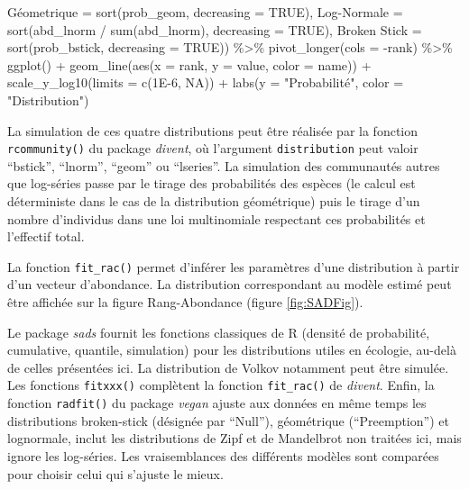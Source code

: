 \documentclass[
  11pt,
  american,
  a4paper,
  extrafontsizes,onecolumn,openright
  ]{memoir}
\newenvironment{Shaded}{\begin{snugshade}}{\end{snugshade}}
\newcommand{\AttributeTok}[1]{\textcolor[rgb]{0.77,0.63,0.00}{#1}}
\newcommand{\ConstantTok}[1]{\textcolor[rgb]{0.00,0.00,0.00}{#1}}
\newcommand{\FloatTok}[1]{\textcolor[rgb]{0.00,0.00,0.81}{#1}}
\newcommand{\FunctionTok}[1]{\textcolor[rgb]{0.00,0.00,0.00}{#1}}
\newcommand{\NormalTok}[1]{#1}
\newcommand{\OtherTok}[1]{\textcolor[rgb]{0.56,0.35,0.01}{#1}}
\newcommand{\SpecialCharTok}[1]{\textcolor[rgb]{0.00,0.00,0.00}{#1}}
\newcommand{\StringTok}[1]{\textcolor[rgb]{0.31,0.60,0.02}{#1}}
\begin{document}
\begin{Shaded}
\begin{Highlighting}[]
  \StringTok{\textasciigrave{}}\AttributeTok{Géometrique}\StringTok{\textasciigrave{}} \OtherTok{=} \FunctionTok{sort}\NormalTok{(prob\_geom, }\AttributeTok{decreasing =} \ConstantTok{TRUE}\NormalTok{),}
  \StringTok{\textasciigrave{}}\AttributeTok{Log{-}Normale}\StringTok{\textasciigrave{}} \OtherTok{=} \FunctionTok{sort}\NormalTok{(abd\_lnorm }\SpecialCharTok{/} \FunctionTok{sum}\NormalTok{(abd\_lnorm), }\AttributeTok{decreasing =} \ConstantTok{TRUE}\NormalTok{),}
  \StringTok{\textasciigrave{}}\AttributeTok{Broken Stick}\StringTok{\textasciigrave{}} \OtherTok{=} \FunctionTok{sort}\NormalTok{(prob\_bstick, }\AttributeTok{decreasing =} \ConstantTok{TRUE}\NormalTok{)) }\SpecialCharTok{\%\textgreater{}\%} 
  \FunctionTok{pivot\_longer}\NormalTok{(}\AttributeTok{cols =} \SpecialCharTok{{-}}\NormalTok{rank) }\SpecialCharTok{\%\textgreater{}\%} 
  \FunctionTok{ggplot}\NormalTok{() }\SpecialCharTok{+}
    \FunctionTok{geom\_line}\NormalTok{(}\FunctionTok{aes}\NormalTok{(}\AttributeTok{x =}\NormalTok{ rank, }\AttributeTok{y =}\NormalTok{ value, }\AttributeTok{color =}\NormalTok{ name)) }\SpecialCharTok{+}
    \FunctionTok{scale\_y\_log10}\NormalTok{(}\AttributeTok{limits =} \FunctionTok{c}\NormalTok{(}\FloatTok{1E{-}6}\NormalTok{, }\ConstantTok{NA}\NormalTok{)) }\SpecialCharTok{+}
    \FunctionTok{labs}\NormalTok{(}\AttributeTok{y =} \StringTok{"Probabilité"}\NormalTok{, }\AttributeTok{color =} \StringTok{"Distribution"}\NormalTok{)}
\end{Highlighting}
\end{Shaded}

\normalsize

La simulation de ces quatre distributions peut être réalisée par la fonction \texttt{rcommunity()} du package \emph{divent}, où l'argument \texttt{distribution} peut valoir \enquote{bstick}, \enquote{lnorm}, \enquote{geom} ou \enquote{lseries}.
La simulation des communautés autres que log-séries passe par le tirage des probabilités des espèces (le calcul est déterministe dans le cas de la distribution géométrique) puis le tirage d'un nombre d'individus dans une loi multinomiale respectant ces probabilités et l'effectif total.

La fonction \texttt{fit\_rac()} permet d'inférer les paramètres d'une distribution à partir d'un vecteur d'abondance.
La distribution correspondant au modèle estimé peut être affichée sur la figure Rang-Abondance (figure \ref{fig:SADFig}).

Le package \emph{sads} fournit les fonctions classiques de R (densité de probabilité, cumulative, quantile, simulation) pour les distributions utiles en écologie, au-delà de celles présentées ici.
La distribution de Volkov notamment peut être simulée.
Les fonctions \texttt{fitxxx()} complètent la fonction \texttt{fit\_rac()} de \emph{divent}.
Enfin, la fonction \texttt{radfit()} du package \emph{vegan} ajuste aux données en même temps les distributions broken-stick (désignée par \enquote{Null}), géométrique (\enquote{Preemption}) et lognormale, inclut les distributions de Zipf et de Mandelbrot non traitées ici, mais ignore les log-séries.
Les vraisemblances des différents modèles sont comparées pour choisir celui qui s'ajuste le mieux.
\end{document}
